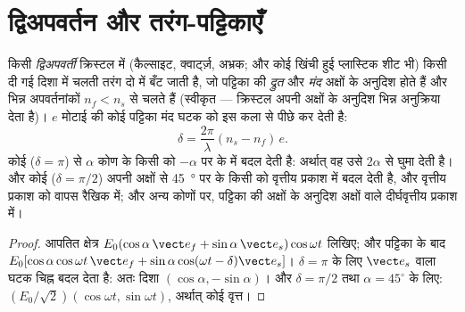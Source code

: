 \section{द्विअपवर्तन और तरंग-पट्टिकाएँ}

\begin{proposition}[तरंग-पट्टिकाएँ]\label{prop:b2:plane-waves-polarization:plates}
किसी \emph{द्विअपवर्ती} क्रिस्टल में (कैल्साइट, क्वार्ट्ज़, अभ्रक; और
कोई खिंची हुई प्लास्टिक शीट भी) किसी दी गई दिशा में चलती तरंग
दो  में बँट जाती है, जो पट्टिका की \emph{द्रुत} और
\emph{मंद} अक्षों के अनुदिश होते हैं और भिन्न अपवर्तनांकों $n_f <
n_s$ से चलते हैं (स्वीकृत --- क्रिस्टल अपनी अक्षों के अनुदिश भिन्न अनुक्रिया देता है)।
$e$ मोटाई की कोई पट्टिका मंद घटक को इस कला से पीछे कर देती है:
\[
\delta = \frac{2\pi}\lambda(n_s - n_f)\,e .
\]
कोई \emph{} ($\delta = \pi$)  से
$\alpha$ कोण के किसी  को $-\alpha$ पर के  में बदल देती है: अर्थात् वह
उसे $2\alpha$ से घुमा देती है। और कोई \emph{} ($\delta = \pi/2$) अपनी अक्षों से
\qty{45}{\degree} पर के किसी  को वृत्तीय प्रकाश में बदल देती है,
और वृत्तीय प्रकाश को वापस रैखिक में; और अन्य कोणों पर, पट्टिका की अक्षों के अनुदिश
अक्षों वाले दीर्घवृत्तीय प्रकाश में।
\end{proposition}

\begin{proof}
आपतित क्षेत्र $E_0(\cos\alpha\,\vect e_f + \sin\alpha\,\vect e_s)\cos\omega t$ लिखिए;
और पट्टिका के बाद $E_0[\cos\alpha\cos\omega t\,\vect e_f + \sin\alpha\cos(\omega t - \delta)
\vect e_s]$। $\delta = \pi$ के लिए $\vect e_s$ वाला घटक चिह्न बदल देता है: अतः दिशा
$(\cos\alpha, -\sin\alpha)$। और $\delta = \pi/2$ तथा $\alpha = 45^\circ$ के लिए: $(E_0/\sqrt2)(\cos
\omega t, \sin\omega t)$, अर्थात् कोई वृत्त।
\end{proof}

